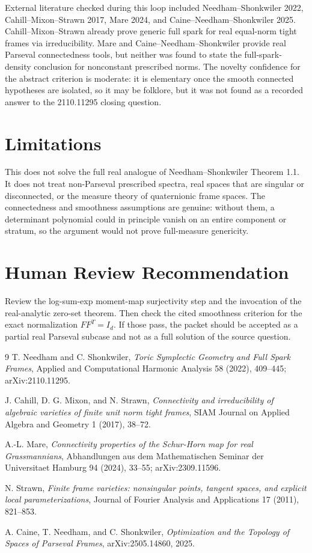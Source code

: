 \documentclass[11pt]{article}
\begin{document}
External literature checked during this loop included Needham--Shonkwiler 2022, Cahill--Mixon--Strawn 2017, Mare 2024, and Caine--Needham--Shonkwiler 2025. Cahill--Mixon--Strawn already prove generic full spark for real equal-norm tight frames via irreducibility. Mare and Caine--Needham--Shonkwiler provide real Parseval connectedness tools, but neither was found to state the full-spark-density conclusion for nonconstant prescribed norms. The novelty confidence for the abstract criterion is moderate: it is elementary once the smooth connected hypotheses are isolated, so it may be folklore, but it was not found as a recorded answer to the 2110.11295 closing question.

\section{Limitations}

This does not solve the full real analogue of Needham--Shonkwiler Theorem 1.1. It does not treat non-Parseval prescribed spectra, real spaces that are singular or disconnected, or the measure theory of quaternionic frame spaces. The connectedness and smoothness assumptions are genuine: without them, a determinant polynomial could in principle vanish on an entire component or stratum, so the argument would not prove full-measure genericity.

\section{Human Review Recommendation}

Review the log-sum-exp moment-map surjectivity step and the invocation of the real-analytic zero-set theorem. Then check the cited smoothness criterion for the exact normalization \(FF^T=I_d\). If those pass, the packet should be accepted as a partial real Parseval subcase and not as a full solution of the source question.

\begin{thebibliography}{9}
T. Needham and C. Shonkwiler,
\emph{Toric Symplectic Geometry and Full Spark Frames},
Applied and Computational Harmonic Analysis 58 (2022), 409--445;
arXiv:2110.11295.

J. Cahill, D. G. Mixon, and N. Strawn,
\emph{Connectivity and irreducibility of algebraic varieties of finite unit norm tight frames},
SIAM Journal on Applied Algebra and Geometry 1 (2017), 38--72.

A.-L. Mare,
\emph{Connectivity properties of the Schur-Horn map for real Grassmannians},
Abhandlungen aus dem Mathematischen Seminar der Universitaet Hamburg 94 (2024), 33--55;
arXiv:2309.11596.

N. Strawn,
\emph{Finite frame varieties: nonsingular points, tangent spaces, and explicit local parameterizations},
Journal of Fourier Analysis and Applications 17 (2011), 821--853.

A. Caine, T. Needham, and C. Shonkwiler,
\emph{Optimization and the Topology of Spaces of Parseval Frames},
arXiv:2505.14860, 2025.
\end{thebibliography}
\end{document}

